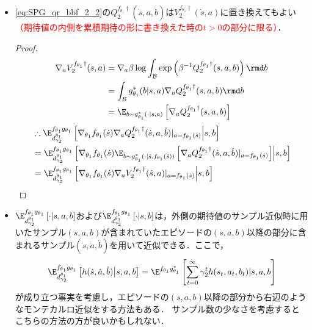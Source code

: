 \documentclass[a4paper,10pt,dvipdfmx]{jsarticle}
\begin{document}
\begin{itemize}
    \item \cref{eq:SPG_qr_bbf_2_2}の$Q_2^{f_{\theta_1}\dag}(\dot{s},a,\dot{b})$は$V_2^{f_{\theta_1}\dag}(\dot{s},a)$に置き換えてもよい\textcolor{red}{（期待値の内側を累積期待の形に書き換えた時の$t>0$の部分に限る）}．
    \begin{proof}
        \begin{subequations}
        \begin{align}
            \nabla_{a}V_2^{f_{\theta_1}\dag}(s,a)&=\nabla_{a}\beta\log\int_{\mathcal{B}}\exp \left(\beta^{-1}Q_2^{f_{\theta_1}\dag}(s,a,b)\right)\rmd b\\
            &=\int_{\mathcal{B}}g_{\theta_1}^*(b|s,a)\nabla_{a}Q_2^{f_{\theta_1}\dag}(s,a,b)\rmd b\\
            &=\E_{b\sim g_{\theta_1}^*(\cdot|s,a)}\left[\nabla_{a}Q_2^{f_{\theta_1}\dag}(s,a,b)\right]
        \end{align}
        \end{subequations}
        \begin{subequations}
        \begin{align}
            &\therefore\E_{d_{\gamma_2}^{\theta_1}}^{f_{\theta_1}g_{\theta_1}}\left[\nabla_{\theta_1}f_{\theta_1}(\dot{s})\nabla_{a}Q_2^{f_{\theta_1}\dag}(\dot{s},a,\dot{b})|_{a=f_{\theta_1}(\dot{s})}\middle|s,b\right]\\
            &=\E_{d_{\gamma_2}^{\theta_1}}^{f_{\theta_1}g_{\theta_1}}\left[\nabla_{\theta_1}f_{\theta_1}(\dot{s})\E_{\dot{b}\sim g_{\theta_1}^*(\cdot|\dot{s},f_{\theta_1}(\dot{s}))}\left[\nabla_{a}Q_2^{f_{\theta_1}\dag}(\dot{s},a,\dot{b})|_{a=f_{\theta_1}(\dot{s})}\right]\middle|s,b\right]\\
            &=\E_{d_{\gamma_2}^{\theta_1}}^{f_{\theta_1}g_{\theta_1}}\left[\nabla_{\theta_1}f_{\theta_1}(\dot{s})\nabla_{a}V_2^{f_{\theta_1}\dag}(\dot{s},a)|_{a=f_{\theta_1}(\dot{s})}\middle|s,b\right]
        \end{align}
        \end{subequations}
    \end{proof}
    \item $\E_{d_{\gamma_2}^{\theta_1}}^{f_{\theta_1}g_{\theta_1}}\left[\cdot\middle|s,a,b\right]$および$\E_{d_{\gamma_2}^{\theta_1}}^{f_{\theta_1}g_{\theta_1}}\left[\cdot\middle|s,b\right]$は，外側の期待値のサンプル近似時に用いたサンプル$(s,a,b)$が含まれていたエピソードの$(s,a,b)$以降の部分に含まれるサンプル$(\dot{s},\dot{a},\dot{b})$を用いて近似できる．ここで，
    \begin{align}
        \E_{d_{\gamma_2}^{\theta_1}}^{f_{\theta_1}g_{\theta_1}}\left[h(\dot{s},\dot{a},\dot{b})\middle|s,a,b\right]=\E^{f_{\theta_1}g_{\theta_1}^*}\left[\sum_{t=0}^{\infty}\gamma_2^t h(s_t,a_t,b_t)|s,a,b\right]
    \end{align}
    が成り立つ事実を考慮し，エピソードの$(s,a,b)$以降の部分から右辺のようなモンテカルロ近似をする方法もある．
    サンプル数の少なさを考慮するとこちらの方法の方が良いかもしれない．
\end{itemize}
\end{document}
